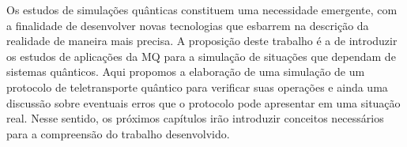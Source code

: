Os estudos de simulações quânticas constituem uma necessidade emergente, com a finalidade de desenvolver novas tecnologias que esbarrem na descrição da realidade de maneira mais precisa. A proposição deste trabalho é a de introduzir os estudos de aplicações da MQ para a simulação de situações que dependam de sistemas quânticos. Aqui propomos a elaboração de uma simulação de um protocolo de teletransporte quântico para verificar suas operações e ainda uma discussão sobre eventuais erros que o protocolo pode apresentar em uma situação real. Nesse sentido, os próximos capítulos irão introduzir conceitos necessários para a compreensão do trabalho desenvolvido.
